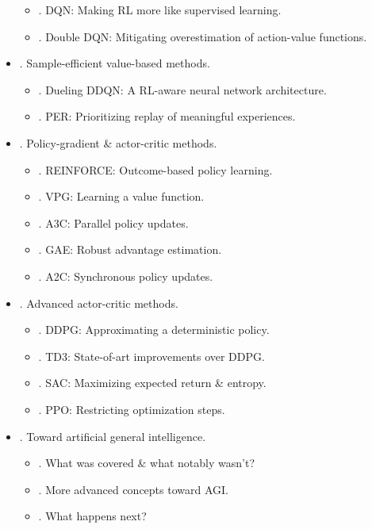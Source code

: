 \documentclass{article}
\begin{document}
\begin{itemize}
\begin{itemize}
        \item {. DQN: Making RL more like supervised learning.}
        \item {. Double DQN: Mitigating overestimation of action-value functions.}
    \end{itemize}
    \item {. Sample-efficient value-based methods.}
    \begin{itemize}
        \item {. Dueling DDQN: A RL-aware neural network architecture.}
        \item {. PER: Prioritizing replay of meaningful experiences.}
    \end{itemize}
    \item {. Policy-gradient \& actor-critic methods.}
    \begin{itemize}
        \item {. REINFORCE: Outcome-based policy learning.}
        \item {. VPG: Learning a value function.}
        \item {. A3C: Parallel policy updates.}
        \item {. GAE: Robust advantage estimation.}
        \item {. A2C: Synchronous policy updates.}
    \end{itemize}
    \item {. Advanced actor-critic methods.}
    \begin{itemize}
        \item {. DDPG: Approximating a deterministic policy.}
        \item {. TD3: State-of-art improvements over DDPG.}
        \item {. SAC: Maximizing expected return \& entropy.}
        \item {. PPO: Restricting optimization steps.}
    \end{itemize}
    \item {. Toward artificial general intelligence.}
    \begin{itemize}
        \item {. What was covered \& what notably wasn't?}
        \item {. More advanced concepts toward AGI.}
        \item {. What happens next?}
    \end{itemize}
\end{itemize}
\end{document}
